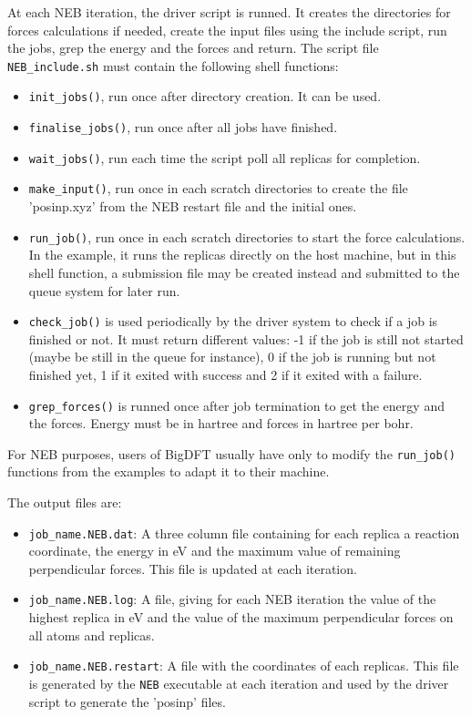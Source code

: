 \documentclass[a4paper,11pt]{report}
\begin{document}
At each NEB iteration, the driver script is runned. It creates the directories for forces calculations if needed, create the input files using the include script, run the jobs, grep the energy and the forces and return. The script file \texttt{NEB\_include.sh} must contain the following shell functions:
\begin{itemize}
  \item \texttt{init\_jobs()}, run once after directory creation. It can be used.
  \item \texttt{finalise\_jobs()}, run once after all jobs have finished.
  \item \texttt{wait\_jobs()}, run each time the script poll all replicas for completion.
  \item \texttt{make\_input()}, run once in each scratch directories to create the file 'posinp.xyz' from the NEB restart file and the initial ones.
  \item \texttt{run\_job()}, run once in each scratch directories to start the force calculations. In the example, it runs the replicas directly on the host machine, but in this shell function, a submission file may be created instead and submitted to the queue system for later run.
  \item \texttt{check\_job()} is used periodically by the driver system to check if a job is finished or not. It must return different values: -1 if the job is still not started (maybe be still in the queue for instance), 0 if the job is running but not finished yet, 1 if it exited with success and 2 if it exited with a failure.
  \item \texttt{grep\_forces()} is runned once after job termination to get the energy and the forces. Energy must be in hartree and forces in hartree per bohr.
  \end{itemize}
For NEB purposes, users of BigDFT usually have only to modify the \texttt{run\_job()} functions from the examples to adapt it to their machine.

The output files are:
\begin{itemize}
  \item \texttt{job\_name.NEB.dat}: A three column file containing for each replica a reaction coordinate, the energy in eV and the maximum value of remaining perpendicular forces. This file is updated at each iteration.
  \item \texttt{job\_name.NEB.log}: A file, giving for each NEB iteration the value of the highest replica in eV and the value of the maximum perpendicular forces on all atoms and replicas.
  \item \texttt{job\_name.NEB.restart}: A file with the coordinates of each replicas. This file is generated by the \texttt{NEB} executable at each iteration and used by the driver script to generate the 'posinp' files.
\end{itemize}
\end{document}
